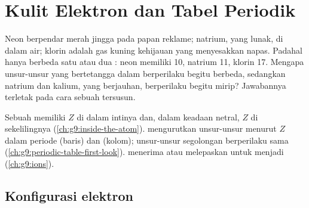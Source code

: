 \chapter{Kulit Elektron dan Tabel Periodik}\label{ch:g10:electron-shells}

Neon berpendar merah jingga pada papan reklame; natrium,  yang
lunak,  di dalam air; klorin adalah gas kuning kehijauan yang
menyesakkan napas. Padahal  hanya berbeda satu atau dua
: neon memiliki 10, natrium 11, klorin 17. Mengapa unsur-unsur
yang bertetangga dalam  berperilaku begitu berbeda,
sedangkan natrium dan kalium, yang  berjauhan, berperilaku
begitu mirip? Jawabannya terletak pada cara  sebuah
 tersusun.

\begin{recall}
Sebuah  memiliki $Z$  di dalam intinya dan, dalam keadaan
netral, $Z$  di sekelilingnya (\cref{ch:g9:inside-the-atom}).
 mengurutkan unsur-unsur menurut $Z$ dalam periode (baris)
dan  (kolom); unsur-unsur segolongan berperilaku sama
(\cref{ch:g9:periodic-table-first-look}).  menerima atau melepaskan
 untuk menjadi  (\cref{ch:g9:ions}).
\end{recall}

\section{Konfigurasi elektron}

